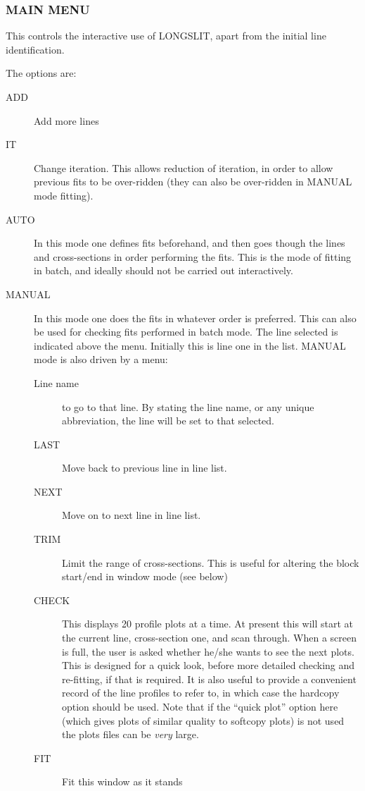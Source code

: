 \subsubsection{MAIN MENU}
\label{long.main}

This controls the interactive use of LONGSLIT, apart from the initial
line identification.

The options are:
\begin{description}
\item[ADD] Add more lines
\item[IT] Change iteration.
This allows reduction of iteration, in order to allow previous fits to
be over-ridden (they can also be over-ridden in MANUAL mode fitting). 
\item[AUTO] In this mode one defines fits beforehand, and then goes
though the lines and cross-sections in order performing the fits.
This is the mode of fitting in batch, and ideally should not be carried
out interactively.
\item[MANUAL] In this mode one does the fits in whatever order is
preferred.
This can also be used for checking fits performed in batch mode.
The line selected is indicated above the menu.
Initially this is line one in the list.
MANUAL mode is also driven by a menu:\\
\begin{description}
\item[Line name] to go to that line.
By stating the line name, or any unique abbreviation, the line will be
set to that selected.
\item[LAST] Move back to previous line in line list.
\item[NEXT] Move on to next line in line list.
\item[TRIM] Limit the range of cross-sections.
This is useful for altering the block start/end in window mode (see
below)
\item[CHECK] This displays 20 profile plots at a time.
At present this will start at the current line, cross-section one, and
scan through.
When a screen is full, the user is asked whether he/she wants to see the
next plots.
This is designed for a quick look, before more detailed checking and
re-fitting, if that is required.
It is also useful to provide a convenient record of the line profiles to
refer to, in which case the hardcopy option should be used. Note that
if the ``quick plot'' option here (which gives plots of similar quality
to softcopy plots) is not used the plots files can be {\em very} large.
\item[FIT] Fit this window as it stands

\end{description}
\end{description}
